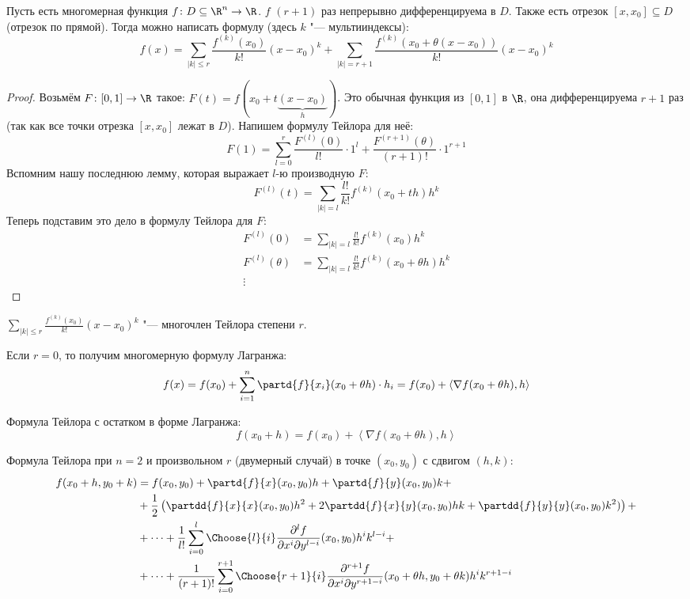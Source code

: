 
\begin{theorem}
	Пусть есть многомерная функция $f \colon D \subseteq \R^n \to \R$.
	$f$ $(r+1)$ раз непрерывно дифференцируема в $D$.
	Также есть отрезок $[x, x_0] \subseteq D$ (отрезок по прямой).
	Тогда можно написать формулу (здесь $k$ "--- мультииндексы):
	\[ f(x) = \sum_{|k| \le r} \frac{f^{(k)}(x_0)}{k!} (x - x_0)^k + \sum_{|k| = r + 1} \frac{f^{(k)}(x_0+\theta(x-x_0))}{k!} (x-x_0)^k\]
\end{theorem}
\begin{proof}
	Возьмём $F \colon [0, 1] \to \R$ такое: $F(t)=f(x_0+t\underbrace{(x-x_0)}_{h})$.
	Это обычная функция из $[0, 1]$ в $\R$, она дифференцируема $r+1$ раз (так как все точки отрезка $[x, x_0]$ лежат в $D$).
	Напишем формулу Тейлора для неё:
	\[ F(1) = \sum_{l=0}^r \frac{F^{(l)}(0)}{l!} \cdot 1^l + \frac{F^{(r+1)}(\theta)}{(r+1)!} \cdot 1 ^ {r+1}\]
	Вспомним нашу последнюю лемму, которая выражает $l$-ю производную $F$:
	\[ F^{(l)}(t) = \sum_{|k| = l} \frac{l!}{k!} f^{(k)}(x_0+th) h^k\]
	Теперь подставим это дело в формулу Тейлора для $F$:
	\begin{align*}
		F^{(l)}(0) &= \sum_{|k| = l} \frac{l!}{k!} f^{(k)}(x_0) h^k \\
		F^{(l)}(\theta) &= \sum_{|k| = l} \frac{l!}{k!} f^{(k)}(x_0 + \theta h) h^k \\
		\vdots
	\end{align*}
\end{proof}
\begin{Rem}
	$\sum_{|k|\le r} \frac{f^{(k)} (x_0)}{k!} (x - x_0) ^ k$ "--- многочлен Тейлора степени $r$.
\end{Rem}
\begin{Rem}
	Если $r=0$, то получим многомерную формулу Лагранжа:
	\[f(x) = f(x_0) + \sum_{i=1}^n \partd{f}{x_i} (x_0+\theta h) \cdot h_i = f(x_0) + \left< \nabla f(x_0+\theta h), h \right>\]
\end{Rem}
\begin{conseq}
	Формула Тейлора с остатком в форме Лагранжа:
	\[ f(x_0 + h) = f(x_0) + \left< \nabla f (x_0+\theta h), h \right> \]
\end{conseq}
\begin{Rem}
	Формула Тейлора при $n=2$ и произвольном $r$ (двумерный случай) в точке $(x_0, y_0)$ с сдвигом $(h, k)$:
	\begin{align*}
		f(x_0+h, y_0+k)
			&= f(x_0, y_0)
			+ \partd{f}{x}(x_0, y_0)h + \partd{f}{y}(x_0, y_0)k + \\
			&+ \frac12\left(
				\partdd{f}{x}{x} (x_0, y_0) h^2
				+ 2\partdd{f}{x}{y} (x_0, y_0) hk
				+  \partdd{f}{y}{y} (x_0, y_0) k^2)
			\right) + \\
			&+ \dots
			+ \frac{1}{    l!} \sum_{i=0}^l     \Choose{l  }{i} \frac{\partial^l     f}{\partial x^i \partial y^{l  -i}} (x_0, y_0)                   h^i k^{l  -i} + \\
			&+ \dots
			+ \frac{1}{(r+1)!} \sum_{i=0}^{r+1} \Choose{r+1}{i} \frac{\partial^{r+1} f}{\partial x^i \partial y^{r+1-i}} (x_0+\theta h, y_0+\theta k) h^i k^{r+1-i}
	\end{align*}
\end{Rem}


